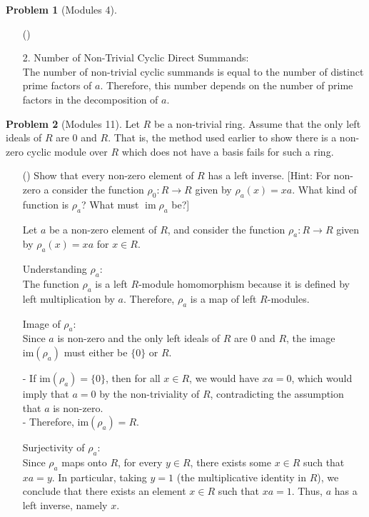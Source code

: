 \documentclass[12pt]{article}
\theoremstyle{definition}
\newtheorem{problem}{Problem}
\newcounter{subq}[problem]
\newenvironment{subproblem}
{\refstepcounter{subq} \begin{itemize} \item[(\alph{subq})]}
{\end{itemize} \medskip}
\DeclareMathOperator{\ima}{im}
\begin{document}
\begin{problem} [Modules 4]
\begin{subproblem}
\begin{solution}
            2. Number of Non-Trivial Cyclic Direct Summands:\\
            The number of non-trivial cyclic summands is equal to the number of distinct prime factors of \( a \). Therefore, this number depends on the number of prime factors in the decomposition of \( a \).

        \end{solution}
    \end{subproblem}
\end{problem}

\begin{problem} [Modules 11]
    Let $R$ be a non-trivial ring. Assume that the only left ideals of $R$ are $0$ and $R$. That is, the method used earlier to show there is
    a non-zero cyclic module over $R$ which does not have a basis fails for such a ring.

    \begin{subproblem}
        Show that every non-zero element of $R$ has a left inverse. [Hint: For non-zero a consider the function $\rho_0: R \longrightarrow R$
        given by $\rho_a(x) = xa$. What kind of function is $\rho_a$? What must $\ima{\rho_a}$ be?]

        \begin{solution}

            Let \( a \) be a non-zero element of \( R \), and consider the function \( \rho_a: R \to R \) given by \( \rho_a(x) = xa \) for \( x \in R \).

            Understanding \( \rho_a \):\\
            The function \( \rho_a \) is a left \( R \)-module homomorphism because it is defined by left multiplication by \( a \). Therefore, \( \rho_a \) is a map of left \( R \)-modules.

            Image of \( \rho_a \):\\  
            Since \( a \) is non-zero and the only left ideals of \( R \) are \( 0 \) and \( R \), the image \( \text{im}(\rho_a) \) must either be \( \{0\} \) or \( R \).

            - If \( \text{im}(\rho_a) = \{0\} \), then for all \( x \in R \), we would have \( xa = 0 \), which would imply that \( a = 0 \) by the non-triviality of \( R \), contradicting the assumption that \( a \) is non-zero.\\
            - Therefore, \( \text{im}(\rho_a) = R \).

            Surjectivity of \( \rho_a \):\\ 
            Since \( \rho_a \) maps onto \( R \), for every \( y \in R \), there exists some \( x \in R \) such that \( xa = y \). In particular, taking \( y = 1 \) (the multiplicative identity in \( R \)), we conclude that there exists an element \( x \in R \) such that \( xa = 1 \). Thus, \( a \) has a left inverse, namely \( x \).



\end{solution}
\end{subproblem}
\end{problem}
\end{document}
